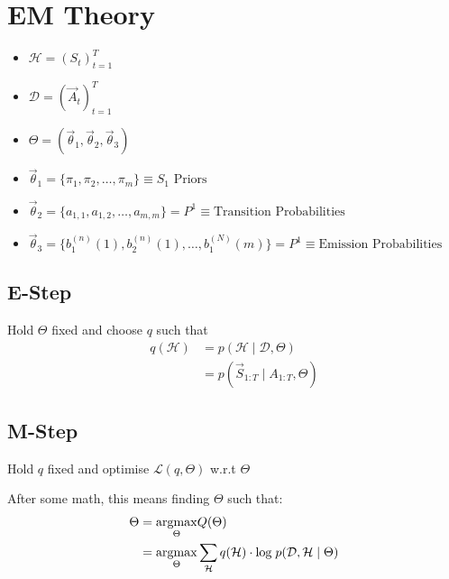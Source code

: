 \section{EM Theory}

\begin{itemize}
    \item $\mathcal{H} = (S_t)_{t=1}^T$
    \item $\mathcal{D} = (\vec{A}_t)_{t=1}^T$ 
    \item $\Theta = (\vec{\theta}_1, \vec{\theta}_2, \vec{\theta}_3)$
    \item $\vec{\theta}_1 = \{\pi_1, \pi_2, \dots, \pi_m\} \equiv S_1 \text{ Priors}$
    \item $\vec{\theta}_2 = \{a_{1,1}, a_{1,2}, \dots, a_{m,m}\} = P^1 \equiv \text{Transition Probabilities}$
    \item $\vec{\theta}_3 = \{b_1^{(n)}(1), b_2^{(n)}(1), \dots, b_1^{(N)}(m)\} = P^1 \equiv \text{Emission Probabilities}$
\end{itemize}

\subsection{E-Step}

Hold $\Theta$ fixed and choose $q$ such that 
\[
    \begin{aligned}
        q(\mathcal{H}) &= p(\mathcal{H} \mid \mathcal{D}, \Theta) \\
        &= p(\vec{S}_{1:T} \mid A_{1:T}, \Theta)
    \end{aligned}
\]


\subsection{M-Step}

Hold $q$ fixed and optimise $\mathscr{L}(q, \Theta)$ w.r.t $\Theta$ 


After some math, this means finding $\Theta$ such that:
\[
    \begin{aligned}
        \Theta &= \underset{\Theta}{\operatorname{argmax}} Q(\Theta) \\
        &= \underset{\Theta}{\operatorname{argmax}} \sum\limits_{\mathcal{H}} q(\mathcal{H}) \cdot \text{log} \hspace{0.1cm} p(\mathcal{D}, \mathcal{H} \mid \Theta)
    \end{aligned}
\]




\newpage

